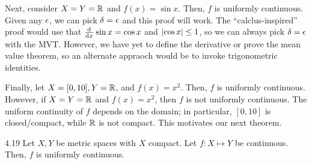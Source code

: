 Next, consider $X = Y = \mathbb{R}$ and $f(x) = \sin x$. Then, $f$ is uniformly continuous. Given any $\epsilon$, we can pick $\delta = \epsilon$ and this proof will work. The ``calclus-inspired'' proof would use that $\od{}{x}\sin x = \cos x$ and $\abs{\cos x} \leq 1$, so we can always pick $\delta = \epsilon$ with the MVT. However, we have yet to define the derivative or prove the mean value theorem, so an alternate appraoch would be to invoke trigonometric identities.

Finally, let $X = [0, 10], Y = \mathbb{R}$, and $f(x) = x^2$. Then, $f$ is uniformly continuous. However, if $X = Y = \mathbb{R}$ and $f(x) = x^2$, then $f$ is not uniformly continuous. The uniform continuity of $f$ depends on the domain; in particular, $[0, 10]$ is closed/compact, while $\mathbb{R}$ is not compact. This motivates our next theorem.

\begin{theorem}{}{4.19}
    Let $X, Y$ be metric spaces with $X$ compact. Let $f: X \mapsto Y$ be continuous. Then, $f$ is uniformly continuous.
\end{theorem}
\begin{nproof}
    
\end{nproof}

\setcounter{rudin}{21}
\begin{theorem}{}{}
    
\end{theorem}